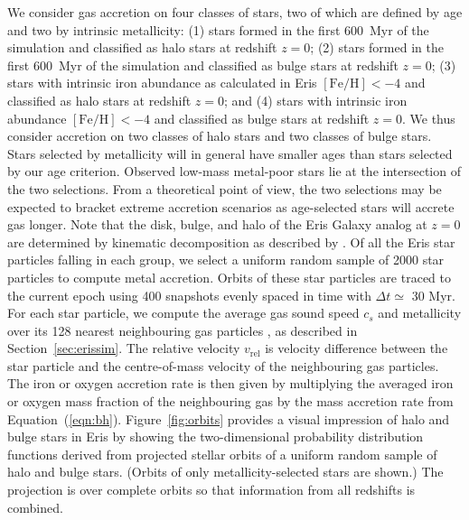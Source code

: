 \documentclass[a4paper,fleqn,usenatbib]{mnras}
\begin{document}
We consider gas accretion on four classes of stars, two of which are
defined by age and two by intrinsic metallicity: (1) stars formed in
the first 600~Myr of the simulation and classified as halo stars at
redshift $z=0$; (2) stars formed in the first 600~Myr of the
simulation and classified as bulge stars at redshift $z=0$; (3) stars
with intrinsic iron abundance as calculated in Eris
$[\mathrm{Fe}/\mathrm{H}]< -4$ and classified as halo stars at
redshift $z=0$; and (4) stars with intrinsic iron abundance
$[\mathrm{Fe}/\mathrm{H}]< -4$ and classified as bulge stars at
redshift $z=0$.  We thus consider accretion on two classes of halo
stars and two classes of bulge stars.  Stars selected by metallicity
will in general have smaller ages than stars selected by our age
criterion.  Observed low-mass metal-poor stars lie at the intersection
of the two selections.  From a theoretical point of view, the two
selections may be expected to bracket extreme accretion scenarios as
age-selected stars will accrete gas longer.  Note that the disk,
bulge, and halo of the Eris Galaxy analog at $z=0$ are determined by
kinematic decomposition as described by \citet{Guedes11}.  Of all the
Eris star particles falling in each group, we select a uniform random
sample of 2000 star particles to compute metal accretion.  Orbits of
these star particles are traced to the current epoch using 400
snapshots evenly spaced in time with $\Delta t \simeq$ 30 Myr.  For
each star particle, we compute the average gas sound speed $c_{s}$ and
metallicity over its 128 nearest neighbouring gas particles
\citep{2015ApJ...807..115S}, as described in
Section~\ref{sec:erissim}.  The relative velocity $v_\mathrm{rel}$ is
velocity difference between the star particle and the centre-of-mass
velocity of the neighbouring gas particles.  The iron or oxygen
accretion rate is then given by multiplying the averaged iron or
oxygen mass fraction of the neighbouring gas by the mass accretion
rate from Equation~(\ref{eqn:bh}).  Figure~\ref{fig:orbits} provides a
visual impression of halo and bulge stars in Eris by showing the
two-dimensional probability distribution functions derived from
projected stellar orbits of a uniform random sample of halo and bulge
stars.  (Orbits of only metallicity-selected stars are shown.)  The
projection is over complete orbits so that information from all
redshifts is combined.
\end{document}
